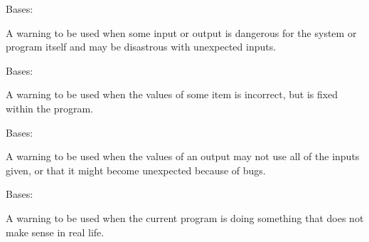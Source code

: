 \documentclass[letterpaper,10pt,english]{sphinxmanual}
\begin{document}

\begin{fulllineitems}
\label{\detokenize{Robustness.warning:Robustness.warning.DangerWarning}}
Bases: 

A warning to be used when some input or output is dangerous for the
system or program itself and may be disastrous with unexpected inputs.

\end{fulllineitems}


\begin{fulllineitems}
\label{\detokenize{Robustness.warning:Robustness.warning.InputWarning}}
Bases: 

A warning to be used when the values of some item is incorrect, but is
fixed within the program.

\end{fulllineitems}


\begin{fulllineitems}
\label{\detokenize{Robustness.warning:Robustness.warning.OutputWarning}}
Bases: 

A warning to be used when the values of an output may not use all of the
inputs given, or that it might become unexpected because of bugs.

\end{fulllineitems}


\begin{fulllineitems}
\label{\detokenize{Robustness.warning:Robustness.warning.PhysicalityWarning}}
Bases: 

A warning to be used when the current program is doing something that does
not make sense in real life.

\end{fulllineitems}
\end{document}
